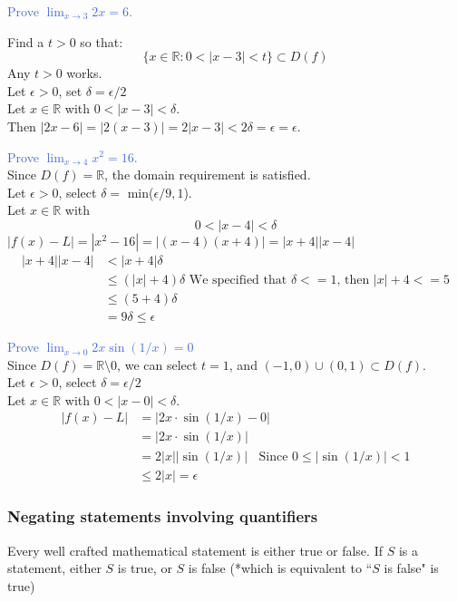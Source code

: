 \documentclass{article}
\newcommand{\exampleblue}[1]{
    \textcolor{RoyalBlue}{#1}
}
\newcommand*\circled[1]{\tikz[baseline=(char.base)]{
            \node[shape=circle,draw,inner sep=0.7pt] (char) {#1};}}
\begin{document}
\bigskip\bigskip
\noindent\exampleblue{Prove $\lim_{x\rightarrow 3} 2x = 6$.}

\noindent \circled{1} Find a $t>0$ so that: $$\{ x\in \mathbb{R}: 0 <|x-3|<t\} \subset D(f)$$ Any $t>0$ works.\\
\circled{2} Let $\epsilon > 0$, set $\delta = \epsilon/2$\\
Let $x\in \mathbb{R}$ with $0<|x-3|<\delta$.\\
Then $|2x-6| = |2(x-3)| = 2|x-3| < 2\delta = \epsilon = \epsilon.$
\medskip

\noindent\exampleblue{Prove $\lim_{x\rightarrow 4} x^2 = 16$.}\\
Since $D(f) = \mathbb{R}$, the domain requirement is satisfied.\\
Let $\epsilon > 0$, select $\delta = $ min($\epsilon/9, 1$).\\
Let $x\in \mathbb{R}$ with
$$0<|x-4|<\delta$$
$|f(x)-L| = |x^2-16| = |(x-4)(x+4)| = |x+4||x-4|$
\begin{align*}
  |x+4||x-4| &< |x+4| \delta\\
             &\leq (|x|+4) \delta \text{  We specified that $\delta<=1$, then $|x|+4<=5$}\\
             &\leq (5+4)\delta\\
             &= 9\delta \leq \epsilon
\end{align*}
\medskip

\noindent\exampleblue{Prove $\lim_{x\rightarrow 0} 2x\sin(1/x) = 0$}\\
Since $D(f) = \mathbb{R} \setminus {0}$, we can select $t = 1$, and $(-1,0) \cup (0,1) \subset D(f)$.\\
Let $\epsilon >0$, select $\delta = \epsilon/2$\\
Let $x\in \mathbb{R}$ with $0<|x-0|<\delta$.\\
\begin{align*}
   |f(x)-L|  & = |2x \cdot \sin(1/x) - 0|\\
             & = |2x \cdot \sin(1/x)|\\
             &= 2|x||\sin(1/x)|  \;\;\text{   Since  } 0\leq |\sin(1/x)| < 1\\
             &\leq 2|x| = \epsilon
\end{align*}

\subsubsection{Negating statements involving quantifiers}
Every well crafted mathematical statement is either true or false. If $S$ is a statement, either $S$ is true, or $S$ is false (*which is equivalent to ``$S$ is false" is true)
\end{document}
